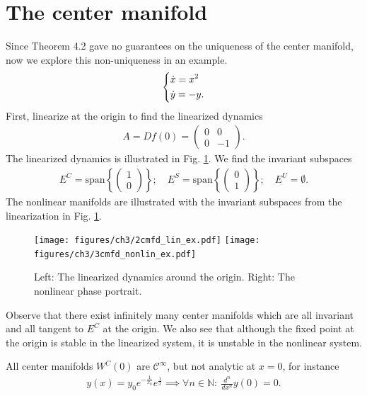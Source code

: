 \section{The center manifold}
\begin{ex}
	Since Theorem 4.2 gave no guarantees on the uniqueness of the center manifold, now we explore this non-uniqueness in an example.
	\begin{align}
\begin{dcases}
	\dot{x} = x^2 \\
	\dot{y} = -y.
\end{dcases}
	\end{align}
	First, linearize at the origin to find the linearized dynamics
	\begin{align}
		A = Df(0) = 
		\begin{pmatrix}
			0 & 0 \\ 0 & -1
		\end{pmatrix}
		.
	\end{align}
	The linearized dynamics is illustrated in Fig. \ref{fig:cmfd_lin_ex}. We find the invariant subspaces
	\begin{align}
		E^{C} =  \textrm{span}\left\{ 
			\begin{pmatrix}
				1 \\ 0 
			\end{pmatrix}
		\right\};\quad
		E^{S} =  \textrm{span}  \left\{
			\begin{pmatrix}
				0 \\ 1
			\end{pmatrix}
		\right\}; \quad
		E^{U} = \emptyset.
	\end{align}
	The nonlinear manifolds are illustrated with the invariant subspaces from the linearization in Fig. \ref{fig:cmfd_lin_ex}.
	\begin{figure}[h!]
		\centering
		\texttt{[image: figures/ch3/2cmfd\_lin\_ex.pdf]}
		\texttt{[image: figures/ch3/3cmfd\_nonlin\_ex.pdf]}
		\caption{Left: The linearized dynamics around the origin. Right: The nonlinear phase portrait. }
		\label{fig:cmfd_lin_ex}
	\end{figure}
	Observe that there exist infinitely many center manifolds which are all invariant and all tangent to $E^{C}$ at the origin. We also see that although the fixed point at the origin is stable in the linearized system, it is unstable in the nonlinear system.

	\begin{remark}[]
		All center manifolds $W^{C}(0)$ are $\mathcal{C}^{\infty }$, but not analytic at $x=0$, for instance
		\begin{align}
			y(x) = y_0 e^{-\frac{1}{x_0}}e^{\frac{1}{x}} \implies \forall n \in \mathbb{N}:\ \frac{d^{n}}{dx^{n}}y(0) = 0.
		\end{align}
		
	\end{remark}
	
\end{ex}

